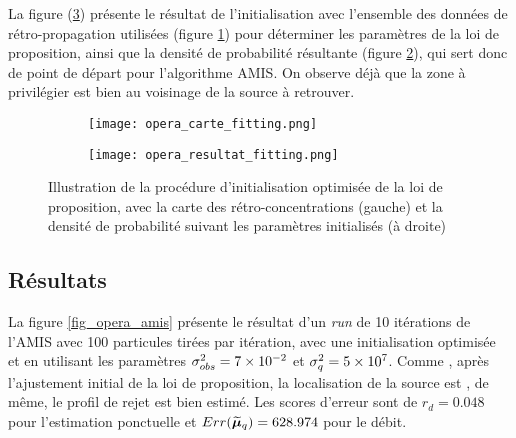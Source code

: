La figure (\ref{fig_opera_fitting}) présente le résultat de l'initialisation avec l'ensemble des données de rétro-propagation utilisées (figure \ref{opera_carte_fitting}) pour déterminer les paramètres de la loi de proposition, ainsi que la densité de probabilité résultante  (figure \ref{opera_resultat_fitting}), qui sert donc de point de départ pour l'algorithme AMIS. On observe déjà que la zone à privilégier est bien au voisinage de la source à retrouver.\\

\begin{figure}[h!]
	\centering
	\begin{subfigure}[t]{0.5\textwidth}
		\centering
		\texttt{[image: opera\_carte\_fitting.png]}
		\caption{}
		\label{opera_carte_fitting}
	\end{subfigure}%
	\begin{subfigure}[t]{0.5\textwidth}
		\centering
		\texttt{[image: opera\_resultat\_fitting.png]}
		\caption{}
		\label{opera_resultat_fitting}
	\end{subfigure}
	\caption{Illustration de la procédure d'initialisation optimisée de la loi de proposition, avec la carte des rétro-concentrations (gauche) et la densité de probabilité suivant les paramètres initialisés (à droite)}
	\label{fig_opera_fitting}
	
\end{figure}

\subsection{Résultats}

La figure \ref{fig_opera_amis} présente le résultat d'un \textit{run} de 10 itérations de l'AMIS avec 100 particules tirées par itération, avec une initialisation optimisée et en utilisant les paramètres ${\sigma_{obs}^2} = 7 \times 10^{-2}$ et $\sigma_q^2 = 5\times 10^7$. Comme , après l'ajustement initial de la loi de proposition, la localisation de la source est , de même, le profil de rejet est bien estimé. Les scores d'erreur sont de $r_d = 0.048$ pour l'estimation ponctuelle et $Err(\widetilde{{\bm{\mu}}}_q) = 628.974$ pour le débit.


